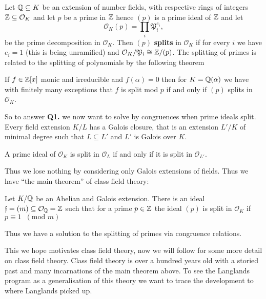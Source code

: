 Let \(\Q \subseteq K\) be an extension of number fields, with respective rings of integers \(\Z \subseteq \mathcal{O}_K\) and let \(p\) be a prime in \(\Z\) hence \((p)\) is a prime ideal of \(\Z\) and let 
\[\mathcal{O}_K(p) = \prod_i \mathfrak{P}_i^{e_i},\]
be the prime decomposition in \(\mathcal{O}_K\). Then \((p)\) \textbf{splits} in \(\mathcal{O}_K\) if for every \(i\) we  have \(e_i = 1\) (this is being unramified) and \(\mathcal{O}_K/\mathfrak{P}_i \cong \Z/(p)\). The splitting of primes is related to the splitting of polynomials by the following theorem
\begin{Theorem}
	If \(f\in \Z[x]\) monic and irreducible and \(f(\alpha) = 0\) then for \(K = \Q(\alpha)\) we have with finitely many exceptions that \(f\) is split mod \(p\) if and only if \((p)\) splits in \(\mathcal{O}_K\).
\end{Theorem}
\begin{example}
	
\end{example}
So to answer \textbf{Q1.} we now want to solve by congruences when prime ideals split. Every field extension \(K/L\) has a Galois closure, that is an extension \(L'/K\) of minimal degree such that \(L\subseteq L'\) and \(L'\) is Galois over \(K\). 
\begin{Lemma}
	A prime ideal of \(\mathcal{O}_K\) is split in \(\mathcal{O}_L\) if and only if it is split in \(\mathcal{O}_{L'}\).
\end{Lemma}
Thus we lose nothing by considering only Galois extensions of fields. Thus we have ``the main theorem'' of class field theory:
\begin{Theorem}\label{thm:reciprocity}
	Let \(K/\Q\) be an Abelian and Galois extension. There is an ideal \(\mathfrak{f} = (m)\subseteq \mathcal{O}_\Q = \Z\) such that for a prime \(p\in \Z\) the ideal \((p)\) is split in \(\mathcal{O}_K\) if \(p\equiv 1 \;\; (\text{mod }m)\)
\end{Theorem} 
Thus we have a solution to the splitting of primes via congruence relations. 

\begin{example}
	
\end{example}

This we hope motivates class field theory, now we will follow \cite{conradHISTORYCLASSFIELD} for some more detail on class field theory. Class field theory is over a hundred years old with a storied past and many incarnations of the main theorem above. To see the Langlands program as a generalisation of this theory we want to trace the development to where Langlands picked up. 

